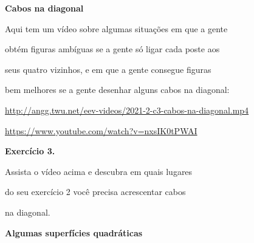 \documentclass[oneside,12pt]{article}
\begin{document}
\newpage

%

{\bf Cabos na diagonal}

Aqui tem um vídeo sobre algumas situações em que a gente

obtém figuras ambíguas se a gente só ligar cada poste aos

seus quatro vizinhos, e em que a gente consegue figuras

bem melhores se a gente desenhar alguns cabos na diagonal:

\msk

{\footnotesize

\url{http://angg.twu.net/eev-videos/2021-2-c3-cabos-na-diagonal.mp4}

\url{https://www.youtube.com/watch?v=nxsIK0tPWAI}

}

\bsk
\bsk


{\bf Exercício 3.}

Assista o vídeo acima e descubra em quais lugares

do seu exercício 2 você precisa acrescentar cabos

na diagonal.



\newpage


{\bf Algumas superfícies quadráticas}

\end{document}
